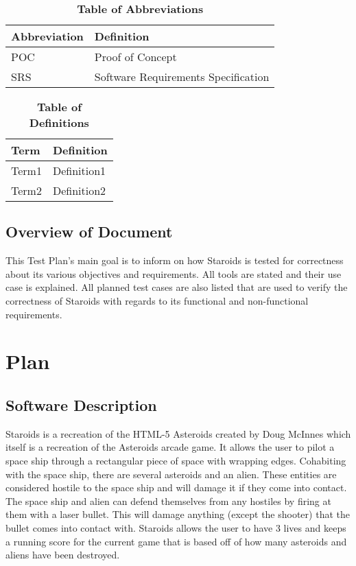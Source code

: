 \documentclass[12pt, titlepage]{article}
\begin{document}
\begin{table}[hbp]
\caption{\textbf{Table of Abbreviations}} \label{Table}

\begin{tabularx}{\textwidth}{p{3cm}X}
\toprule
\textbf{Abbreviation} & \textbf{Definition} \\
\midrule
POC & Proof of Concept\\
SRS & Software Requirements Specification\\
\bottomrule
\end{tabularx}

\end{table}

\begin{table}[!htbp]
\caption{\textbf{Table of Definitions}} \label{Table}

\begin{tabularx}{\textwidth}{p{3cm}X}
\toprule
\textbf{Term} & \textbf{Definition}\\
\midrule
Term1 & Definition1\\
Term2 & Definition2\\
\bottomrule
\end{tabularx}

\end{table}

\subsection{Overview of Document}
This Test Plan's main goal is to inform on how Staroids is tested for correctness about its various objectives and requirements. All tools are stated and their use case is explained. All planned test cases are also listed that are used to verify the correctness of Staroids with regards to its functional and non-functional requirements.

\section{Plan}

\subsection{Software Description}
Staroids is a recreation of the HTML-5 Asteroids created by Doug McInnes which itself is a recreation of the Asteroids arcade game. It allows the user to pilot a space ship through a rectangular piece of space with wrapping edges. Cohabiting with the space ship, there are several asteroids and an alien. These entities are considered hostile to the space ship and will damage it if they come into contact. The space ship and alien can defend themselves from any hostiles by firing at them with a laser bullet. This will damage anything (except the shooter) that the bullet comes into contact with. Staroids allows the user to have 3 lives and keeps a running score for the current game that is based off of how many asteroids and aliens have been destroyed.
\end{document}
